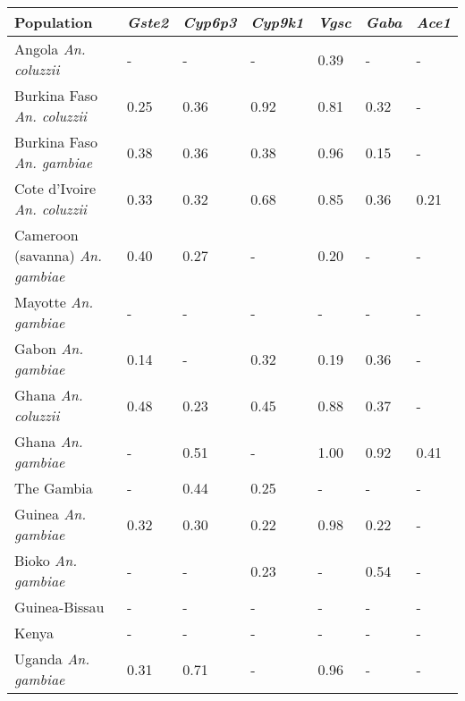 \begin{tabular}{lllllll}
\toprule
                              Population & \textit{Gste2} & \textit{Cyp6p3} & \textit{Cyp9k1} & \textit{Vgsc} & \textit{Gaba} & \textit{Ace1} \\
\midrule
            Angola \textit{An. coluzzii} &              - &               - &               - &          0.39 &             - &             - \\
      Burkina Faso \textit{An. coluzzii} &           0.25 &            0.36 &            0.92 &          0.81 &          0.32 &             - \\
       Burkina Faso \textit{An. gambiae} &           0.38 &            0.36 &            0.38 &          0.96 &          0.15 &             - \\
     Cote d'Ivoire \textit{An. coluzzii} &           0.33 &            0.32 &            0.68 &          0.85 &          0.36 &          0.21 \\
 Cameroon (savanna) \textit{An. gambiae} &           0.40 &            0.27 &               - &          0.20 &             - &             - \\
            Mayotte \textit{An. gambiae} &              - &               - &               - &             - &             - &             - \\
              Gabon \textit{An. gambiae} &           0.14 &               - &            0.32 &          0.19 &          0.36 &             - \\
             Ghana \textit{An. coluzzii} &           0.48 &            0.23 &            0.45 &          0.88 &          0.37 &             - \\
              Ghana \textit{An. gambiae} &              - &            0.51 &               - &          1.00 &          0.92 &          0.41 \\
                              The Gambia &              - &            0.44 &            0.25 &             - &             - &             - \\
             Guinea \textit{An. gambiae} &           0.32 &            0.30 &            0.22 &          0.98 &          0.22 &             - \\
              Bioko \textit{An. gambiae} &              - &               - &            0.23 &             - &          0.54 &             - \\
                           Guinea-Bissau &              - &               - &               - &             - &             - &             - \\
                                   Kenya &              - &               - &               - &             - &             - &             - \\
             Uganda \textit{An. gambiae} &           0.31 &            0.71 &               - &          0.96 &             - &             - \\
\bottomrule
\end{tabular}
